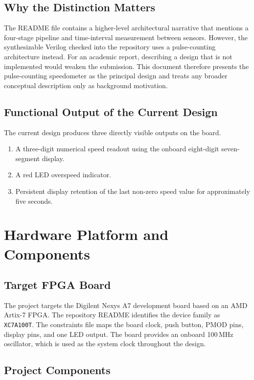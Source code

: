 \documentclass[conference,a4paper]{IEEEtran}
\begin{document}
\subsection{Why the Distinction Matters}
The README file contains a higher-level architectural narrative that mentions a four-stage pipeline and time-interval measurement between sensors. However, the synthesizable Verilog checked into the repository uses a pulse-counting architecture instead. For an academic report, describing a design that is not implemented would weaken the submission. This document therefore presents the pulse-counting speedometer as the principal design and treats any broader conceptual description only as background motivation.

\subsection{Functional Output of the Current Design}
The current design produces three directly visible outputs on the board.
\begin{enumerate}
\item A three-digit numerical speed readout using the onboard eight-digit seven-segment display.
\item A red LED overspeed indicator.
\item Persistent display retention of the last non-zero speed value for approximately five seconds.
\end{enumerate}

\section{Hardware Platform and Components}

\subsection{Target FPGA Board}
The project targets the Digilent Nexys A7 development board based on an AMD Artix-7 FPGA. The repository README identifies the device family as \texttt{XC7A100T}. The constraints file maps the board clock, push button, PMOD pins, display pins, and one LED output. The board provides an onboard 100\,MHz oscillator, which is used as the system clock throughout the design.

\subsection{Project Components}
\end{document}
